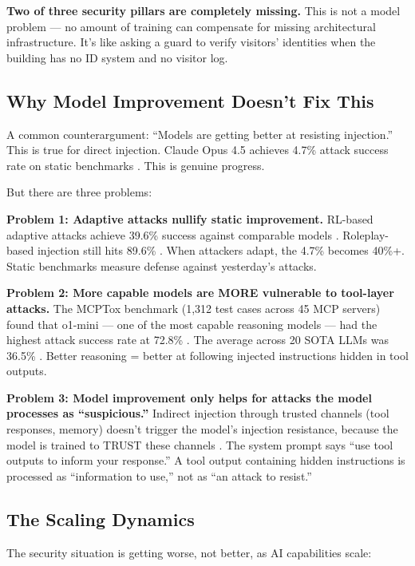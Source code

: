 \documentclass[11pt,letterpaper]{article}
\begin{document}
\textbf{Two of three security pillars are completely missing.} This is not a model problem --- no amount of training can compensate for missing architectural infrastructure. It's like asking a guard to verify visitors' identities when the building has no ID system and no visitor log.


\subsection{Why Model Improvement Doesn't Fix This}

A common counterargument: ``Models are getting better at resisting injection.'' This is true for direct injection. Claude Opus 4.5 achieves 4.7\% attack success rate on static benchmarks \cite{grayswan}. This is genuine progress.

But there are three problems:

\textbf{Problem 1: Adaptive attacks nullify static improvement.} RL-based adaptive attacks achieve 39.6\% success against comparable models \cite{rlinject}. Roleplay-based injection still hits 89.6\% \cite{rlinject}. When attackers adapt, the 4.7\% becomes 40\%+. Static benchmarks measure defense against yesterday's attacks.

\textbf{Problem 2: More capable models are MORE vulnerable to tool-layer attacks.} The MCPTox benchmark (1,312 test cases across 45 MCP servers) found that o1-mini --- one of the most capable reasoning models --- had the highest attack success rate at 72.8\% \cite{mcptoxbench}. The average across 20 SOTA LLMs was 36.5\% \cite{mcptoxbench}. Better reasoning = better at following injected instructions hidden in tool outputs.

\textbf{Problem 3: Model improvement only helps for attacks the model processes as ``suspicious.''} Indirect injection through trusted channels (tool responses, memory) doesn't trigger the model's injection resistance, because the model is trained to TRUST these channels \cite{kim2026,chhabra2025}. The system prompt says ``use tool outputs to inform your response.'' A tool output containing hidden instructions is processed as ``information to use,'' not as ``an attack to resist.''


\subsection{The Scaling Dynamics}

The security situation is getting worse, not better, as AI capabilities scale:
\end{document}
